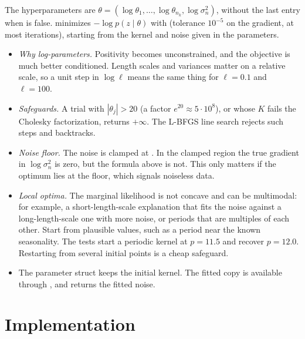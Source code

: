 The hyperparameters are
$\theta=(\log\theta_1,\dots,\log\theta_{n_k},\log\sigma_n^2)$, without the last entry when
 is false.  minimizes $-\log p(z\mid\theta)$ with
 (tolerance $10^{-5}$ on the gradient, at most 
iterations), starting from the kernel and noise given in the parameters.
\begin{itemize}
  \item \emph{Why log-parameters.} Positivity becomes unconstrained, and the
        objective is much better conditioned. Length scales and variances matter on a
        relative scale, so a unit step in $\log\ell$ means the same thing for $\ell=0.1$ and $\ell=100$.
  \item \emph{Safeguards.} A trial with $|\theta_j|>20$ (a factor $e^{20}\approx5\cdot10^8$), or
        whose $K$ fails the Cholesky factorization, returns $+\infty$. The L-BFGS line search
        rejects such steps and backtracks.
  \item \emph{Noise floor.} The noise is clamped at . In
        the clamped region the true gradient in $\log\sigma_n^2$ is zero, but the formula
        above is not. This only matters if the optimum lies at the floor, which
        signals noiseless data.
  \item \emph{Local optima.} The marginal likelihood is not concave and can be
        multimodal: for example, a short-length-scale explanation that fits the noise against a long-length-scale one with
        more noise, or periods that are multiples of each other. Start from plausible values,
        such as a period near the known seasonality. The  tests start a periodic kernel at
        $p=11.5$ and recover $p=12.0$. Restarting from several initial points is a cheap
        safeguard.
  \item The parameter struct keeps the initial kernel. The fitted copy is
        available through , and  returns the fitted noise.
\end{itemize}

\section{Implementation}

